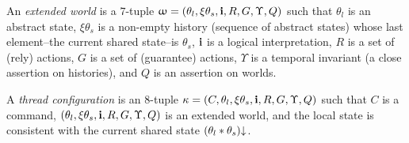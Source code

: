 \begin{defin}\label{def:extworld}
  An \emph{extended world}  
  is a $7$-tuple $\upomega=(\theta_l,\xi\theta_s,{\bf i},R,G,\Upsilon, Q)$ such that
  $\theta_l$ is an abstract state,
  $\xi\theta_s$ is a non-empty history (sequence of abstract states) whose last element--the current shared state--is $\theta_s$, 
  ${\bf i}$ is a  logical interpretation, 
  $R$ is a  set of (rely) actions, 
  $G$ is a set of (guarantee) actions, 
  $\Upsilon$ is a temporal invariant (a close assertion on histories),
  and $Q$ is an assertion on worlds.
\end{defin}

\begin{defin}\label{def:config}
  A \emph{thread configuration}  
  is an $8$-tuple $\kappa=(C,\theta_l,\xi\theta_s,{\bf i},R,G,\Upsilon, Q)$ 
  such that $C$ is a command, $(\theta_l,\xi\theta_s,{\bf i},R,G,\Upsilon, Q)$
  is an extended world, and the local state is consistent with the current shared  state $(\theta_l * \theta_s)\mathpunct{\downarrow}$.
\end{defin}  



